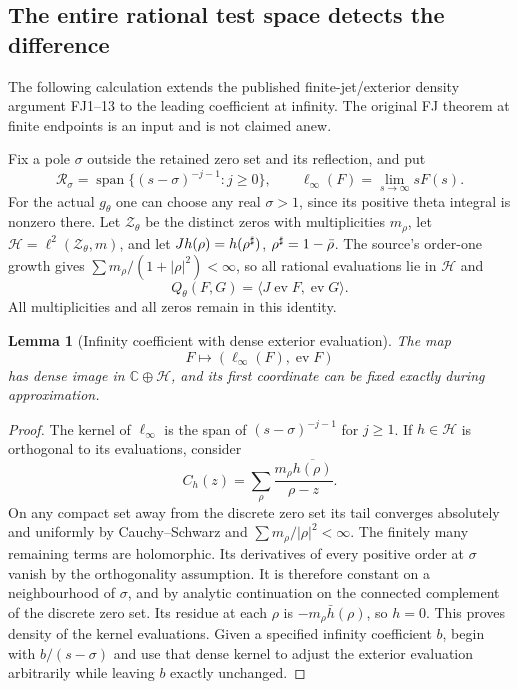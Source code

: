 \documentclass[11pt,a4paper]{article}
\newtheorem{lemma}[theorem]{Lemma}
\theoremstyle{definition}\newtheorem{definition}[theorem]{Definition}
\newcommand{\C}{\mathbb C}\newcommand{\R}{\mathbb R}\newcommand{\N}{\mathbb N}
\newcommand{\Span}{\operatorname{span}}\newcommand{\sgn}{\operatorname{sgn}}
\begin{document}
\subsection{The entire rational test space detects the difference}
The following calculation extends the published finite-jet/exterior density argument FJ1--13 \cite{FJ} to the leading coefficient at infinity. The original FJ theorem at finite endpoints is an input and is not claimed anew.

Fix a pole $\sigma$ outside the retained zero set and its reflection, and put
\begin{equation}
 \mathcal R_\sigma=\Span\{(s-\sigma)^{-j-1}:j\ge0\},\qquad
 \ell_\infty(F)=\lim_{s\to\infty}sF(s).                       \tag{CW6}\label{CW6}
\end{equation}
For the actual $g_\theta$ one can choose any real $\sigma>1$, since its positive theta integral is nonzero there. Let $\mathcal Z_\theta$ be the distinct zeros with multiplicities $m_\rho$, let
$\mathcal H=\ell^2(\mathcal Z_\theta,m)$, and let
$Jh(\rho)=h(\rho^\sharp)$, $\rho^\sharp=1-\bar\rho$. The source's order-one growth gives $\sum m_\rho/(1+|\rho|^2)<\infty$, so all rational evaluations lie in $\mathcal H$ and
\begin{equation}
 Q_\theta(F,G)=\langle J\operatorname{ev}F,\operatorname{ev}G\rangle.
                                                               \tag{CW7}\label{CW7}
\end{equation}
All multiplicities and all zeros remain in this identity.

\begin{lemma}[Infinity coefficient with dense exterior evaluation]
The map
\begin{equation}
 F\longmapsto(\ell_\infty(F),\operatorname{ev}F)
                                                               \tag{CW8}\label{CW8}
\end{equation}
has dense image in $\C\oplus\mathcal H$, and its first coordinate can be fixed exactly during approximation.
\end{lemma}
\begin{proof}
The kernel of $\ell_\infty$ is the span of $(s-\sigma)^{-j-1}$ for $j\ge1$. If $h\in\mathcal H$ is orthogonal to its evaluations, consider
\[
 C_h(z)=\sum_{\rho}\frac{m_\rho\overline{h(\rho)}}{\rho-z}.
\]
On any compact set away from the discrete zero set its tail converges absolutely and uniformly by Cauchy--Schwarz and $\sum m_\rho/|\rho|^2<\infty$. The finitely many remaining terms are holomorphic. Its derivatives of every positive order at $\sigma$ vanish by the orthogonality assumption. It is therefore constant on a neighbourhood of $\sigma$, and by analytic continuation on the connected complement of the discrete zero set. Its residue at each $\rho$ is $-m_\rho\bar h(\rho)$, so $h=0$. This proves density of the kernel evaluations. Given a specified infinity coefficient $b$, begin with $b/(s-\sigma)$ and use that dense kernel to adjust the exterior evaluation arbitrarily while leaving $b$ exactly unchanged.
\end{proof}
\end{document}
